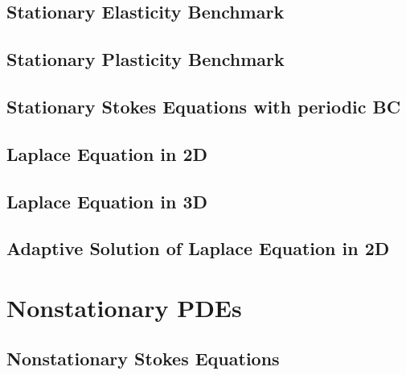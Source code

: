 \documentclass[a4paper,cleardoubleempty]{scrreprt}
\begin{document}
\subsection{Stationary Elasticity Benchmark} 
\label{PDE_Stat_Elasticity}

\clearpage
\subsection{Stationary Plasticity Benchmark} 
\label{PDE_Stat_Plasticity}

\clearpage
\subsection{Stationary Stokes Equations with periodic BC} 
\label{PDE_Stat_Periodic_Stokes}

\clearpage
\subsection{Laplace Equation in 2D} 
\label{PDE_Stat_Laplace_2D}

\clearpage
\subsection{Laplace Equation in 3D}
\label{PDE_Stat_Laplace_3D}

\clearpage
\subsection{Adaptive Solution of Laplace Equation in 2D}
\label{PDE_adap_Stat_Laplace}

\clearpage
\section{Nonstationary PDEs}
\label{PDE_Instat}

\subsection{Nonstationary Stokes Equations}
\label{PDE_Instat_Stokes}

\clearpage
\end{document}
